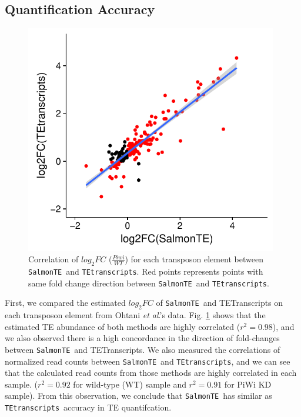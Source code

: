 \documentclass{ws-procs11x85}
\newcommand{\etal}{\textit{et al}.}
\newcommand{\TEtranscripts}{\texttt{TEtranscripts}}
\newcommand{\SalmonTE}{\texttt{SalmonTE}}
\begin{document}
\subsection{Quantification Accuracy}

\begin{figure}[h]
\centerline{
\includegraphics[width=11cm]{figure_corr_FC}
}
\caption{Correlation of $log_{2}FC$ ($\frac{Piwi}{WT}$) for each transposon element between \SalmonTE~and \TEtranscripts. Red points represents points with same fold change direction between \SalmonTE~and \TEtranscripts.}
\label{aba:fig2}
\end{figure}

First, we compared the estimated $log_{2}FC$ of \SalmonTE~and TETranscripts on each transposon element from Ohtani \etal's data. 
Fig. \ref{aba:fig2} shows that the estimated TE abundance of both methods are highly correlated ($r^{2}=0.98$), and we also observed there is a high concordance in the direction of fold-changes between \SalmonTE~and TETranscripts. We also measured the correlations of normalized read counts between \SalmonTE~and \TEtranscripts, 
and we can see that the calculated read counts from those methods are highly correlated in each sample. ($r^2=0.92$ for wild-type (WT) sample and $r^2=0.91$ for PiWi KD sample).
From this observation, we conclude that \SalmonTE~has similar as  \TEtranscripts~accuracy in TE quantifcation.
\end{document}

